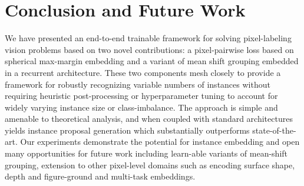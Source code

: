 \section{Conclusion and Future Work}
We have presented an end-to-end trainable framework for solving pixel-labeling
vision problems based on two novel contributions: a pixel-pairwise loss based
on spherical max-margin embedding and a variant of mean shift grouping embedded
in a recurrent architecture. These two components mesh closely to provide a
framework for robustly recognizing variable numbers of instances without
requiring heuristic post-processing or hyperparameter tuning to account for
widely varying instance size or class-imbalance. The approach is simple and
amenable to theoretical analysis, and when coupled with standard architectures
yields instance proposal generation which substantially outperforms
state-of-the-art. Our experiments demonstrate the potential for instance
embedding and open many opportunities for future work including learn-able
variants of mean-shift grouping, extension to other pixel-level domains such as
encoding surface shape, depth and figure-ground and multi-task embeddings.




